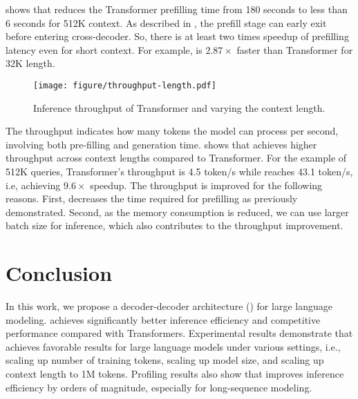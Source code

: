  shows that \our{} reduces the Transformer prefilling time from 180 seconds to less than 6 seconds for 512K context.
As described in , the prefill stage can early exit before entering cross-decoder. So, there is at least two times speedup of prefilling latency even for short context.
For example, \our{} is $2.87\times$ faster than Transformer for 32K length.

\begin{figure*}[t]
\centering
\captionsetup{type=figure}
\texttt{[image: figure/throughput-length.pdf]}
\caption{Inference throughput of Transformer and \our{} varying the context length.}
\label{fig:throughput}
\end{figure*}

The throughput indicates how many tokens the model can process per second, involving both pre-filling and generation time.
 shows that \our{} achieves higher throughput across context lengths compared to Transformer.
For the example of 512K queries, Transformer's throughput is 4.5 token/s while \our{} reaches 43.1 token/s, i.e, achieving $9.6\times$ speedup.
The throughput is improved for the following reasons.
First, \our{} decreases the time required for prefilling as previously demonstrated.
Second, as the memory consumption is reduced, we can use larger batch size for inference, which also contributes to the throughput improvement.

\section{Conclusion}

In this work, we propose a decoder-decoder architecture (\our{}) for large language modeling.
\our{} achieves significantly better inference efficiency and competitive performance compared with Transformers.
Experimental results demonstrate that \our{} achieves favorable results for large language models under various settings, i.e., scaling up number of training tokens, scaling up model size, and scaling up context length to 1M tokens.
Profiling results also show that \our{} improves inference efficiency by orders of magnitude, especially for long-sequence modeling.

